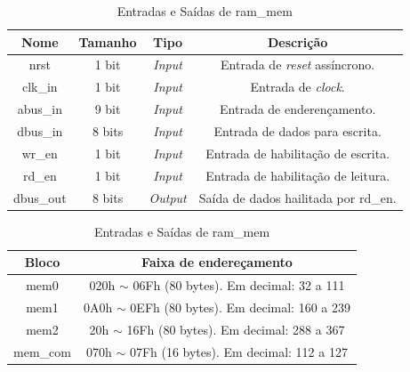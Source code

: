\documentclass{article}
\begin{document}
\begin{table}[ht]
    \begin{center}
        \begin{tabular}{|c|c|c|c|}
            \hline
            Nome & Tamanho & Tipo & Descrição\\
            \hline
            nrst & 1 bit & \textit{Input} & Entrada de \textit{reset} assíncrono.\\
            \hline
            clk\_in & 1 bit & \textit{Input} & Entrada de \textit{clock}.\\
            \hline
            abus\_in & 9 bit & \textit{Input} & Entrada de enderençamento.\\
            \hline
            dbus\_in & 8 bits & \textit{Input} & Entrada de dados para escrita.\\
            \hline
            wr\_en & 1 bit & \textit{Input} & Entrada de habilitação de escrita.\\
            \hline
            rd\_en & 1 bit & \textit{Input} & Entrada de habilitação de leitura.\\
            \hline
            dbus\_out & 8 bits & \textit{Output} & Saída de dados hailitada por rd\_en.\\
            \hline
        \end{tabular}
    \end{center}
    \caption{Entradas e Saídas de ram\_mem}
\end{table}

\begin{table}[ht]
    \begin{center}
        \begin{tabular}{|c|c|}
            \hline
            Bloco & Faixa de endereçamento \\
            \hline
            mem0 & 020h $\sim$ 06Fh (80 bytes). Em decimal: 32 a 111 \\
            \hline
            mem1 & 0A0h $\sim$ 0EFh (80 bytes). Em decimal: 160 a 239 \\
            \hline
            mem2 & 20h $\sim$ 16Fh (80 bytes). Em decimal: 288 a 367 \\
            \hline
            mem\_com & 070h $\sim$ 07Fh (16 bytes). Em decimal: 112 a 127 \\
            \hline
        \end{tabular}
    \end{center}
    \caption{Entradas e Saídas de ram\_mem}
\end{table}
\end{document}
